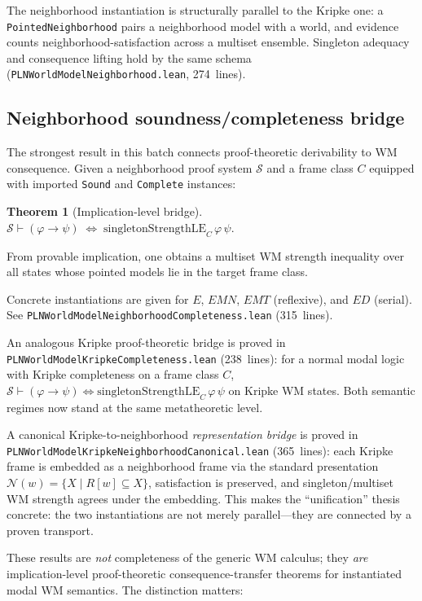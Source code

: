 \documentclass[]{article}
\newtheorem{theorem}{Theorem}
\newcommand{\code}[1]{\texttt{#1}}
\begin{document}
The neighborhood instantiation is structurally parallel to the Kripke one:
a \code{PointedNeighborhood} pairs a neighborhood model with a world, and
evidence counts neighborhood-satisfaction across a multiset ensemble.
Singleton adequacy and consequence lifting hold by the same schema
(\code{PLNWorldModelNeighborhood.lean}, 274~lines).


\subsection{Neighborhood soundness/completeness bridge}
\label{sec:neighborhood-sc}

The strongest result in this batch connects proof-theoretic derivability
to WM consequence. Given a neighborhood proof system $\mathcal{S}$ and a
frame class $C$ equipped with imported \code{Sound} and \code{Complete}
instances:

\begin{theorem}[Implication-level bridge]
\label{thm:neighborhood-sc}
$\mathcal{S} \vdash (\varphi \to \psi)
\;\iff\;
\mathrm{singletonStrengthLE}_C\,\varphi\,\psi.$
\end{theorem}

\noindent
From provable implication, one obtains a multiset WM strength inequality
over all states whose pointed models lie in the target frame class.

Concrete instantiations are given for $E$, $\mathit{EMN}$,
$\mathit{EMT}$ (reflexive), and $\mathit{ED}$ (serial). See
\code{PLNWorldModelNeighborhoodCompleteness.lean} (315~lines).

An analogous Kripke proof-theoretic bridge is proved in
\code{PLNWorldModelKripkeCompleteness.lean} (238~lines): for a normal
modal logic with Kripke completeness on a frame class $C$,
$\mathcal{S} \vdash (\varphi \to \psi)
\iff \mathrm{singletonStrengthLE}_C\,\varphi\,\psi$
on Kripke WM states. Both semantic regimes now stand at the same
metatheoretic level.

A canonical Kripke-to-neighborhood \emph{representation bridge} is
proved in \code{PLNWorldModelKripkeNeighborhoodCanonical.lean}
(365~lines): each Kripke frame is embedded as a neighborhood frame
via the standard presentation $\mathcal{N}(w)=\{X\mid R[w]\subseteq X\}$,
satisfaction is preserved, and singleton/multiset WM strength agrees
under the embedding. This makes the ``unification'' thesis concrete:
the two instantiations are not merely parallel---they are connected by
a proven transport.

These results are \emph{not} completeness of the generic WM calculus;
they \emph{are} implication-level proof-theoretic consequence-transfer
theorems for
instantiated modal WM semantics. The distinction matters:
\end{document}
